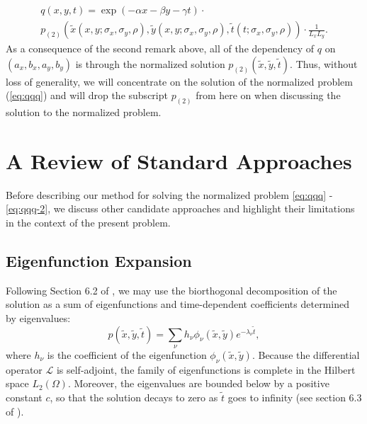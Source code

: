 \begin{multline*}
  q(x,y,t) = \exp(-\alpha x - \beta y - \gamma t) \cdot \\
  p_{(2)}(\tilde{x}(x,y; \sigma_x,\sigma_y,\rho), \tilde{y}(x,y; \sigma_x,\sigma_y,\rho), \tilde{t}(t; \sigma_x,\sigma_y,\rho)) \cdot \frac{1}{L_xL_y}.
\end{multline*}
As a consequence of the second remark above, all of the dependency
of $q$ on $(a_x,b_x,a_y,b_y)$ is through the normalized solution
$p_{(2)}(\tilde{x},\tilde{y},\tilde{t})$. Thus, without loss of
generality, we will concentrate on the solution of the normalized
problem (\ref{eq:qqq}) and will drop the subscript $p_{(2)}$ from here
on when discussing the solution to the normalized problem.



\section{A Review of Standard Approaches}
Before describing our method for solving the normalized problem
\eqref{eq:qqq} - \eqref{eq:qqq-2}, we discuss other candidate
approaches and highlight their limitations in the context of the
present problem.

\subsection{Eigenfunction Expansion} \label{sec:eigenfunction}
Following Section 6.2 of \cite{risken1989fokker-planck}, we may use
the biorthogonal decomposition of the solution as a sum of
eigenfunctions and time-dependent coefficients determined by eigenvalues:
\begin{equation}
  p(\tilde{x},\tilde{y},\tilde{t}) =  \sum_\nu h_\nu \phi_\nu (\tilde{x}, \tilde{y}) e^{-\lambda_\nu \tilde{t}}, \label{eq:biorthogonal}
\end{equation}
where $h_\nu$ is the coefficient of the eigenfunction
$\phi_\nu(\tilde{x}, \tilde{y})$. Because the differential operator
$\mathcal{L}$ is self-adjoint, the family of eigenfunctions is
complete in the Hilbert space $L_2(\Omega)$. Moreover, the eigenvalues
are bounded below by a positive constant $c$, so that the solution
decays to zero as $\tilde{t}$ goes to infinity (see section 6.3 of
\cite{risken1989fokker-planck}).


